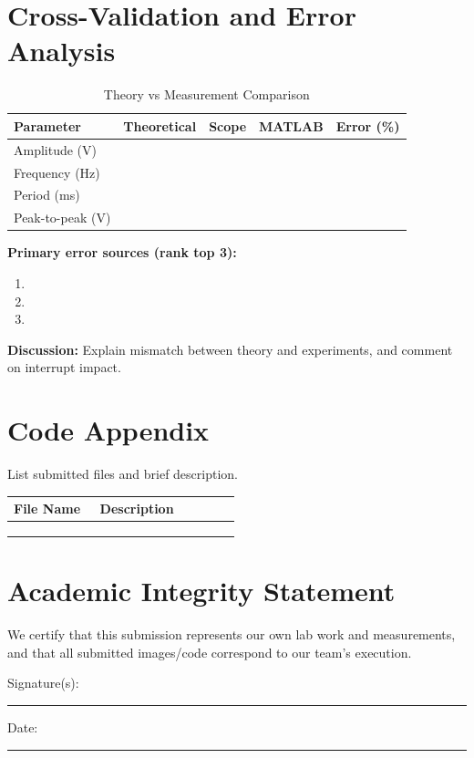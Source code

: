 \documentclass[11pt,letterpaper]{article}
\newcommand{\blank}{\rule{2.2in}{0.4pt}}
\newcommand{\answerbox}[1]{\fbox{\parbox[c][#1][t]{\linewidth}{}}}
\begin{document}
\section{Cross-Validation and Error Analysis}
\begin{table}[H]
\centering
\caption{Theory vs Measurement Comparison}
\begin{tabular}{@{}lcccc@{}}
\toprule
Parameter & Theoretical & Scope & MATLAB & Error (\%) \\
\midrule
Amplitude (V) & & & & \\
Frequency (Hz) & & & & \\
Period (ms) & & & & \\
Peak-to-peak (V) & & & & \\
\bottomrule
\end{tabular}
\end{table}

\textbf{Primary error sources (rank top 3):}
\begin{enumerate}
    \item 
    \item 
    \item 
\end{enumerate}

\textbf{Discussion:} Explain mismatch between theory and experiments, and comment on interrupt impact.
\answerbox{1.5in}

\section{Code Appendix}
List submitted files and brief description.
\begin{longtable}{@{}p{0.35\linewidth}p{0.58\linewidth}@{}}
\toprule
File Name & Description \\
\midrule
\endhead
 & \\
 & \\
 & \\
\bottomrule
\end{longtable}

\section*{Academic Integrity Statement}
We certify that this submission represents our own lab work and measurements, and that all submitted images/code correspond to our team's execution.

Signature(s): \blank \hfill Date: \blank
\end{document}
